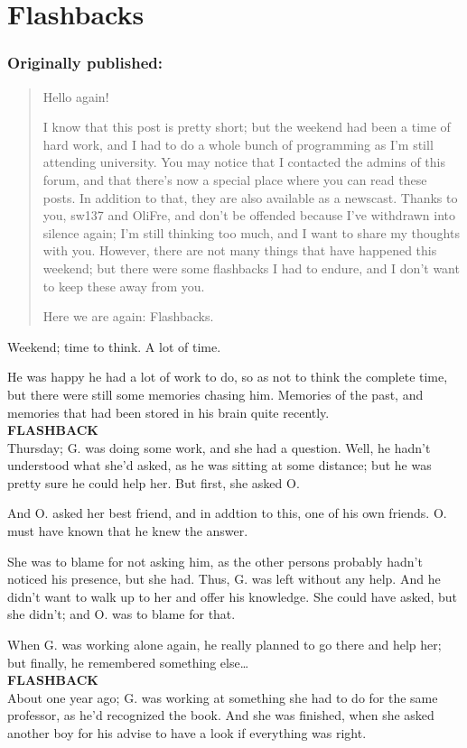\chapter{Flashbacks}
\label{cha:flashbacks}
\subsection*{Originally published: }
\begin{quote}
Hello again!

I know that this post is pretty short; but the weekend had been a time of hard work, and I had to do a whole bunch of programming as I'm still attending university. 
You may notice that I contacted the admins of this forum, and that there's now a special place where you can read these posts. In addition to that, they are also available as a newscast. 
Thanks to you, sw137 and OliFre, and don't be offended because I've withdrawn into silence again; I'm still thinking too much, and I want to share my thoughts with you. 
However, there are not many things that have happened this weekend; but there were some flashbacks I had to endure, and I don't want to keep these away from you.

Here we are again: Flashbacks.
\end{quote}

Weekend; time to think. 
A lot of time.

He was happy he had a lot of work to do, so as not to think the complete time, but there were still some memories chasing him. Memories of the past, and memories that had been stored in his brain quite recently.\\
\textbf{FLASHBACK}\\
Thursday; G. was doing some work, and she had a question. Well, he hadn't understood what she'd asked, as he was sitting at some distance; but he was pretty sure he could help her. 
But first, she asked O.

And O. asked her best friend, and in addtion to this, one of his own friends. 
O. must have known that he knew the answer. 

She was to blame for not asking him, as the other persons probably hadn't noticed his presence, but she had. Thus, G. was left without any help. And he didn't want to walk up to her and offer his knowledge. She could have asked, but she didn't; and O. was to blame for that. 

When G. was working alone again, he really planned to go there and help her; but finally, he remembered something else\dots{}\\
\textbf{FLASHBACK}\\
About one year ago; G. was working at something she had to do for the same professor, as he'd recognized the book. And she was finished, when she asked another boy for his advise to have a look if everything was right.

